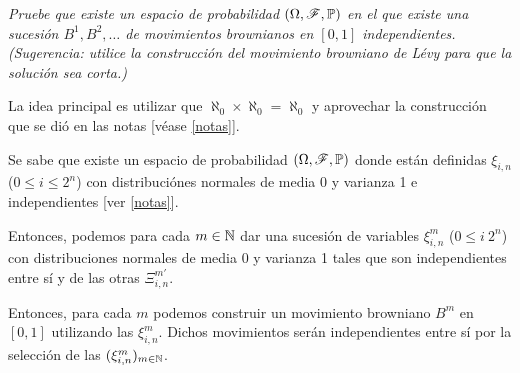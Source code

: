 \emph{
    Pruebe que existe un espacio de probabilidad $ \left(  \Omega ,\mathscr{F} , \mathbb{P}  \right)  $ en el que existe 
    una sucesi\'on $B^1,B^2,\ldots$ de movimientos brownianos en $[0,1]$ 
    independientes. (Sugerencia: utilice la construcci\'on del movimiento 
    browniano de L\'evy  para que la soluci\'on sea corta.)
}
\afterstatement\pn

La idea principal es utilizar que $\aleph_0 \times \aleph_0 = \aleph_0$ y aprovechar
la construcción que se dió en las notas [véase \ref{notas}].\pn

Se sabe que existe un espacio de probabilidad $(\Omega, \mathscr{F}, \mathbb{P})$ donde están
definidas $\xi_{i,n}$ ($0 \leq i \leq 2^n$) con distribuciónes normales de media 0 y 
varianza 1 e independientes [ver \ref{notas}].\pn

Entonces, podemos para cada $m \in \mathbb{N}$ dar una sucesión de variables $\xi_{i,n}^m$
($0 \leq i \ 2^n$) con distribuciones normales de media 0 y varianza 1 tales que
son independientes entre sí y de las otras $\Xi_{i,n}^{m'}$.\pn

Entonces, para cada $m$ podemos construir un movimiento browniano $B^m$ en $[0, 1]$ utilizando
las $\xi_{i,n}^m$. Dichos movimientos serán independientes entre sí por la selección
de las $(\xi_{i,n}^m)_{m \in \mathbb{N}}$.